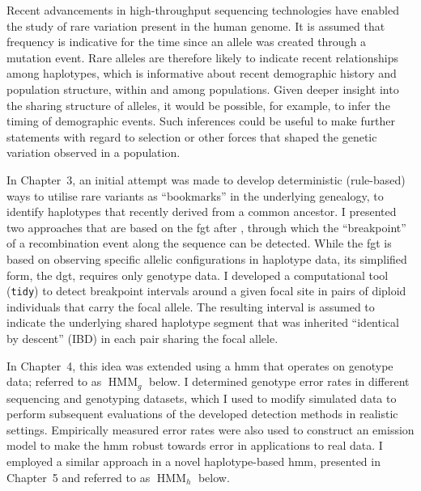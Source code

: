 Recent advancements in high-throughput sequencing technologies have enabled the study of rare variation present in the human genome.
It is assumed that frequency is indicative for the time since an allele was created through a mutation event.
Rare alleles are therefore likely to indicate recent relationships among haplotypes, which is informative about recent demographic history and population structure, within and among populations.
Given deeper insight into the sharing structure of alleles, it would be possible, for example, to infer the timing of demographic events.
Such inferences could be useful to make further statements with regard to selection or other forces that shaped the genetic variation observed in a population.

In Chapter~3, an initial attempt was made to develop deterministic (rule-based) ways to utilise rare variants as ``bookmarks'' in the underlying genealogy, to identify haplotypes that recently derived from a common ancestor.
I presented two approaches that are based on the \gls{fgt} after \citet{Hudson:1985wh}, through which the ``breakpoint'' of a recombination event along the sequence can be detected.
While the \gls{fgt} is based on observing specific allelic configurations in haplotype data, its simplified form, the \gls{dgt}, requires only genotype data.
I developed a computational tool (\texttt{tidy}) to detect breakpoint intervals around a given focal site in pairs of diploid individuals that carry the focal allele.
The resulting interval is assumed to indicate the underlying shared haplotype segment that was inherited ``identical by descent'' (IBD) in each pair sharing the focal allele.

In Chapter~4, this idea was extended using a \gls{hmm} that operates on genotype data; referred to as $\operatorname{HMM}_g$ below.
I determined genotype error rates in different sequencing and genotyping datasets, which I used to modify simulated data to perform subsequent evaluations of the developed detection methods in realistic settings.
Empirically measured error rates were also used to construct an emission model to make the \gls{hmm} robust towards error in applications to real data.
I employed a similar approach in a novel haplotype-based \gls{hmm}, presented in Chapter~5 and referred to as $\operatorname{HMM}_h$ below.

